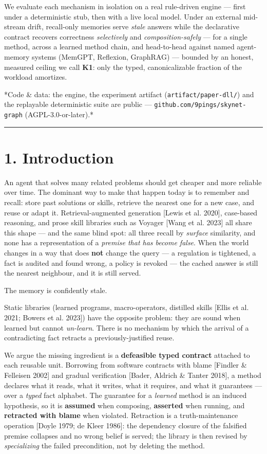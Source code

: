 \documentclass[11pt]{article}
\begin{document}
We evaluate each mechanism in isolation on a real rule-driven engine — first under a deterministic stub, then with a live local model. Under an external mid-stream drift, recall-only memories serve \emph{stale} answers while the declarative contract recovers correctness \emph{selectively} and \emph{composition-safely} — for a single method, across a learned method chain, and head-to-head against named agent-memory systems (MemGPT, Reflexion, GraphRAG) — bounded by an honest, measured ceiling we call \textbf{K1}: only the typed, canonicalizable fraction of the workload amortizes.

*Code \& data: the engine, the experiment artifact (\texttt{artifact/\allowbreak{}paper-dll/\allowbreak{}}) and the replayable deterministic suite are public — \texttt{github.com/\allowbreak{}9pings/\allowbreak{}skynet-graph} (AGPL-3.0-or-later).*

\medskip\hrule\medskip

\section*{1. Introduction}

An agent that solves many related problems should get cheaper and more reliable over time. The dominant way to make that happen today is to remember and recall: store past solutions or skills, retrieve the nearest one for a new case, and reuse or adapt it. Retrieval-augmented generation [Lewis et al. 2020], case-based reasoning, and prose skill libraries such as Voyager [Wang et al. 2023] all share this shape — and the same blind spot: all three recall by \emph{surface} similarity, and none has a representation of a \emph{premise that has become false}. When the world changes in a way that does \textbf{not} change the query — a regulation is tightened, a fact is audited and found wrong, a policy is revoked — the cached answer is still the nearest neighbour, and it is still served.

The memory is confidently stale.

Static libraries (learned programs, macro-operators, distilled skills [Ellis et al. 2021; Bowers et al. 2023]) have the opposite problem: they are sound when learned but cannot \emph{un-learn}. There is no mechanism by which the arrival of a contradicting fact retracts a previously-justified reuse.

We argue the missing ingredient is a \textbf{defeasible typed contract} attached to each reusable unit. Borrowing from software contracts with blame [Findler \& Felleisen 2002] and gradual verification [Bader, Aldrich \& Tanter 2018], a method declares what it reads, what it writes, what it requires, and what it guarantees — over a \emph{typed} fact alphabet. The guarantee for a \emph{learned} method is an induced hypothesis, so it is \textbf{assumed} when composing, \textbf{asserted} when running, and \textbf{retracted with blame} when violated. Retraction is a truth-maintenance operation [Doyle 1979; de Kleer 1986]: the dependency closure of the falsified premise collapses and no wrong belief is served; the library is then revised by \emph{specializing} the failed precondition, not by deleting the method.
\end{document}
